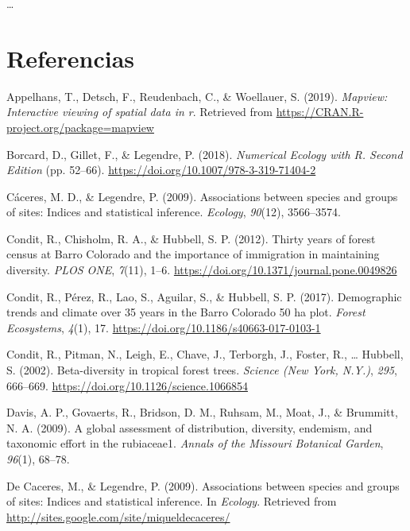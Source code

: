 \documentclass[11pt,]{article}
\begin{document}
\ldots

\section*{Referencias}\label{referencias}

\hypertarget{refs}{}
\hypertarget{ref-cita_mapview}{}
Appelhans, T., Detsch, F., Reudenbach, C., \& Woellauer, S. (2019).
\emph{Mapview: Interactive viewing of spatial data in r}. Retrieved from
\url{https://CRAN.R-project.org/package=mapview}

\hypertarget{ref-borcard_legendre}{}
Borcard, D., Gillet, F., \& Legendre, P. (2018). \emph{Numerical Ecology
with R. Second Edition} (pp. 52--66).
\url{https://doi.org/10.1007/978-3-319-71404-2}

\hypertarget{ref-caceres2009associations}{}
Cáceres, M. D., \& Legendre, P. (2009). Associations between species and
groups of sites: Indices and statistical inference. \emph{Ecology},
\emph{90}(12), 3566--3574.

\hypertarget{ref-condit_et_al_2012}{}
Condit, R., Chisholm, R. A., \& Hubbell, S. P. (2012). Thirty years of
forest census at Barro Colorado and the importance of immigration in
maintaining diversity. \emph{PLOS ONE}, \emph{7}(11), 1--6.
\url{https://doi.org/10.1371/journal.pone.0049826}

\hypertarget{ref-condit_et_al_2017}{}
Condit, R., Pérez, R., Lao, S., Aguilar, S., \& Hubbell, S. P. (2017).
Demographic trends and climate over 35 years in the Barro Colorado 50 ha
plot. \emph{Forest Ecosystems}, \emph{4}(1), 17.
\url{https://doi.org/10.1186/s40663-017-0103-1}

\hypertarget{ref-article_condit}{}
Condit, R., Pitman, N., Leigh, E., Chave, J., Terborgh, J., Foster, R.,
\ldots{} Hubbell, S. (2002). Beta-diversity in tropical forest trees.
\emph{Science (New York, N.Y.)}, \emph{295}, 666--669.
\url{https://doi.org/10.1126/science.1066854}

\hypertarget{ref-davis2009global}{}
Davis, A. P., Govaerts, R., Bridson, D. M., Ruhsam, M., Moat, J., \&
Brummitt, N. A. (2009). A global assessment of distribution, diversity,
endemism, and taxonomic effort in the rubiaceae1. \emph{Annals of the
Missouri Botanical Garden}, \emph{96}(1), 68--78.

\hypertarget{ref-cita_indicspecies}{}
De Caceres, M., \& Legendre, P. (2009). Associations between species and
groups of sites: Indices and statistical inference. In \emph{Ecology}.
Retrieved from \url{http://sites.google.com/site/miqueldecaceres/}
\end{document}

